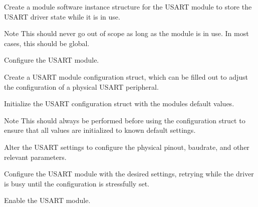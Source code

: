 \begin{DoxyEnumerate}
\item Create a module software instance structure for the U\+S\+A\+RT module to store the U\+S\+A\+RT driver state while it is in use. 
\begin{DoxyCodeInclude}{0}
\end{DoxyCodeInclude}
 \begin{DoxyNote}{Note}
This should never go out of scope as long as the module is in use. In most cases, this should be global.
\end{DoxyNote}

\item Configure the U\+S\+A\+RT module.
\begin{DoxyEnumerate}
\item Create a U\+S\+A\+RT module configuration struct, which can be filled out to adjust the configuration of a physical U\+S\+A\+RT peripheral. 
\begin{DoxyCodeInclude}{0}
\end{DoxyCodeInclude}

\item Initialize the U\+S\+A\+RT configuration struct with the module\textquotesingle{}s default values. 
\begin{DoxyCodeInclude}{0}
\end{DoxyCodeInclude}
 \begin{DoxyNote}{Note}
This should always be performed before using the configuration struct to ensure that all values are initialized to known default settings.
\end{DoxyNote}

\item Alter the U\+S\+A\+RT settings to configure the physical pinout, baudrate, and other relevant parameters. 
\begin{DoxyCodeInclude}{0}
\end{DoxyCodeInclude}

\item Configure the U\+S\+A\+RT module with the desired settings, retrying while the driver is busy until the configuration is stressfully set. 
\begin{DoxyCodeInclude}{0}
\end{DoxyCodeInclude}

\item Enable the U\+S\+A\+RT module. 
\begin{DoxyCodeInclude}{0}
\end{DoxyCodeInclude}


\end{DoxyEnumerate}
\end{DoxyEnumerate}
